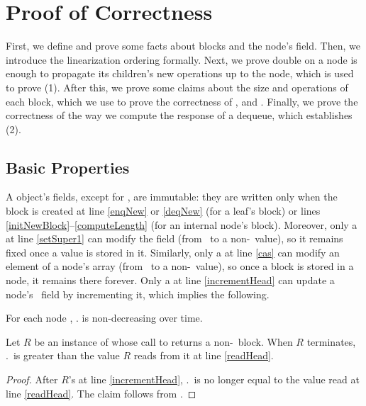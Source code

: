 
\section{Proof of Correctness}


First, we define and prove some facts about blocks and the node's  field. Then, we introduce  the linearization ordering formally. Next, we prove double  on a node is enough to propagate its children's new operations up to the node, which is used to prove (1). After this, we prove some claims about the size and operations of each block, which we use to prove the correctness of ,  and . Finally, we prove the correctness of the way we compute the response of a dequeue, which establishes (2).

\subsection{Basic Properties}

A  object's fields, except for , are immutable:  they are written only 
when the block is created at line \ref{enqNew} or \ref{deqNew} (for a leaf's block) or lines \ref{initNewBlock}--\ref{computeLength} (for an internal node's block).  
Moreover, only a  at line \ref{setSuper1} can modify the  field 
(from \nl\ to a non-\nl\ value), so it remains fixed once a value is stored in it.
Similarly, only a  at line \ref{cas} can modify an element of a node's  array 
(from \nl\ to a non-\nl\ value), so once a block is stored in a node, it remains there forever.
Only a  at line \ref{incrementHead} can update a node's \head\ field by incrementing it,
which implies the following.

\begin{observation} \label{nonDecreasingHead}
For each node ,  . is non-decreasing over time.
\end{observation}

\begin{lemma} \label{lem::headInc}
Let $R$ be an instance of  whose call to  returns a non-\nl\ block.  When $R$ terminates, .\head\ is greater than the value $R$ reads from it at line \ref{readHead}.
\end{lemma}
\begin{proof}
After $R$'s  at line \ref{incrementHead}, .\head\ is no longer equal to the value 
read at line \ref{readHead}.  The claim follows from .
\end{proof}

